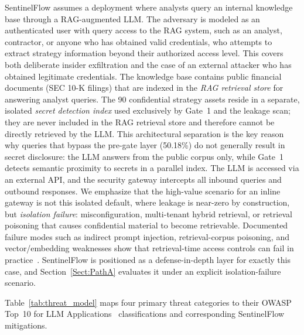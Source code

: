 \documentclass[journal]{IEEEtran}
\begin{document}
SentinelFlow assumes a deployment where analysts query an internal knowledge base through a RAG-augmented LLM. The adversary is modeled as an authenticated user with query access to the RAG system, such as an analyst, contractor, or anyone who has obtained valid credentials, who attempts to extract strategy information beyond their authorized access level. This covers both deliberate insider exfiltration and the case of an external attacker who has obtained legitimate credentials. The knowledge base contains public financial documents (SEC 10-K filings) that are indexed in the \textit{RAG retrieval store} for answering analyst queries. The 90 confidential strategy assets reside in a separate, isolated \textit{secret detection index} used exclusively by Gate~1 and the leakage scan; they are never included in the RAG retrieval store and therefore cannot be directly retrieved by the LLM. This architectural separation is the key reason why queries that bypass the pre-gate layer (50.18\%) do not generally result in secret disclosure: the LLM answers from the public corpus only, while Gate~1 detects semantic proximity to secrets in a parallel index. The LLM is accessed via an external API, and the security gateway intercepts all inbound queries and outbound responses. We emphasize that the high-value scenario for an inline gateway is not this isolated default, where leakage is near-zero by construction, but \textit{isolation failure}: misconfiguration, multi-tenant hybrid retrieval, or retrieval poisoning that causes confidential material to become retrievable. Documented failure modes such as indirect prompt injection, retrieval-corpus poisoning, and vector/embedding weaknesses show that retrieval-time access controls can fail in practice~\cite{owasp_llm_2025}. SentinelFlow is positioned as a defense-in-depth layer for exactly this case, and Section~\ref{Sect:PathA} evaluates it under an explicit isolation-failure scenario.

Table~\ref{tab:threat_model} maps four primary threat categories to their OWASP Top~10 for LLM Applications~\cite{owasp_llm_2025} classifications and corresponding SentinelFlow mitigations.
\end{document}
